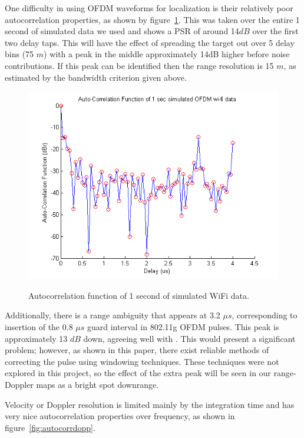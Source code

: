 \documentclass[article,11pt,onecolumn,final]{IEEEtran}
\begin{document}
One difficulty in using OFDM waveforms for localization is their relatively poor autocorrelation properties, as shown by figure~\ref{fig:autocorr}. This was taken over the entire 1 second of simulated data we used and shows a PSR of around 14$dB$ over the first two delay taps. This will have the effect of spreading the target out over 5 delay bins (75 $m$) with a peak in the middle approximately 14dB higher before noise contributions. If this peak can be identified then the range resolution is 15 $m$, as estimated by the bandwidth criterion given above. 

\begin{figure}
	\caption{Autocorrelation function of 1 second of simulated WiFi data.}
	\centering
	\includegraphics[width=400pt]{figures/autocorr.png}
	\label{fig:autocorr}
\end{figure}

Additionally, there is a range ambiguity that appears at 3.2 $\mu s$, corresponding to insertion of the 0.8 $\mu s$ guard interval in 802.11g OFDM pulses. This peak is approximately 13 $dB$ down, agreeing well with \cite{Colone2012}. This would present a significant problem; however, as shown in this paper, there exist reliable methods of correcting the pulse using windowing techniques. These techniques were not explored in this project, so the effect of the extra peak will be seen in our range-Doppler maps as a bright spot downrange.

Velocity or Doppler resolution is limited mainly by the integration time and has very nice autocorrelation properties over frequency, as shown in figure~\ref{fig:autocorrdopp}.
\end{document}
